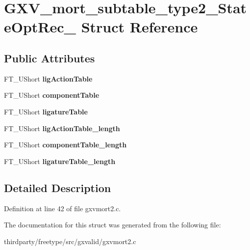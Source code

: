\hypertarget{struct_g_x_v__mort__subtable__type2___state_opt_rec__}{}\section{G\+X\+V\+\_\+mort\+\_\+subtable\+\_\+type2\+\_\+\+State\+Opt\+Rec\+\_\+ Struct Reference}
\label{struct_g_x_v__mort__subtable__type2___state_opt_rec__}
\subsection*{Public Attributes}
\begin{DoxyCompactItemize}
\item 
\mbox{\label{struct_g_x_v__mort__subtable__type2___state_opt_rec___a7dacb9653cfacad1fd7808d98d459ade}} 
F\+T\+\_\+\+U\+Short {\bfseries lig\+Action\+Table}
\item 
\mbox{\label{struct_g_x_v__mort__subtable__type2___state_opt_rec___a4bc582ada04e0ac8cdea2c0381e2ae5c}} 
F\+T\+\_\+\+U\+Short {\bfseries component\+Table}
\item 
\mbox{\label{struct_g_x_v__mort__subtable__type2___state_opt_rec___a6b3fda0a7f13b9661c1043f69cd2b006}} 
F\+T\+\_\+\+U\+Short {\bfseries ligature\+Table}
\item 
\mbox{\label{struct_g_x_v__mort__subtable__type2___state_opt_rec___a823b7aec8c245846e2765c4271b6fbdf}} 
F\+T\+\_\+\+U\+Short {\bfseries lig\+Action\+Table\+\_\+length}
\item 
\mbox{\label{struct_g_x_v__mort__subtable__type2___state_opt_rec___ab9dd94ae444a1041a4b5d15aeb5b762b}} 
F\+T\+\_\+\+U\+Short {\bfseries component\+Table\+\_\+length}
\item 
\mbox{\label{struct_g_x_v__mort__subtable__type2___state_opt_rec___a5a84c4f5f16c584aafbc43f0b84f681b}} 
F\+T\+\_\+\+U\+Short {\bfseries ligature\+Table\+\_\+length}
\end{DoxyCompactItemize}


\subsection{Detailed Description}


Definition at line 42 of file gxvmort2.\+c.



The documentation for this struct was generated from the following file\+:\begin{DoxyCompactItemize}
\item 
thirdparty/freetype/src/gxvalid/gxvmort2.\+c\end{DoxyCompactItemize}
